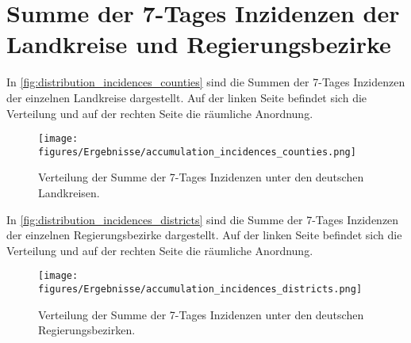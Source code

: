 \section{Summe der 7-Tages Inzidenzen der Landkreise und Regierungsbezirke}
In \autoref{fig:distribution_incidences_counties} sind die Summen der 7-Tages Inzidenzen der einzelnen Landkreise dargestellt. Auf der linken Seite befindet sich die Verteilung und auf der rechten Seite die räumliche Anordnung.

\begin{figure}[H]
    \centering
    \texttt{[image: figures/Ergebnisse/accumulation\_incidences\_counties.png]}
    \caption{Verteilung der Summe der 7-Tages Inzidenzen unter den deutschen Landkreisen.}
    \label{fig:distribution_incidences_counties}
\end{figure}

In \autoref{fig:distribution_incidences_districts} sind die Summe der 7-Tages Inzidenzen der einzelnen Regierungsbezirke dargestellt. Auf der linken Seite befindet sich die Verteilung und auf der rechten Seite die räumliche Anordnung.

\begin{figure}[H]
    \centering
    \texttt{[image: figures/Ergebnisse/accumulation\_incidences\_districts.png]}
    \caption{Verteilung der Summe der 7-Tages Inzidenzen unter den deutschen Regierungsbezirken.}
    \label{fig:distribution_incidences_districts}
\end{figure}